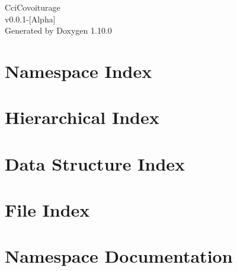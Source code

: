 \documentclass[twoside]{book}
\newcommand{\+}{\discretionary{\mbox{\scriptsize$\hookleftarrow$}}{}{}}
\newcommand{\clearemptydoublepage}{%
    \newpage{\pagestyle{empty}\cleardoublepage}%
  }
\begin{document}
  \raggedbottom
    \hypersetup{pageanchor=false,
                bookmarksnumbered=true,
                pdfencoding=unicode
               }
  \begin{titlepage}
  \vspace*{7cm}
  \begin{center}%
  {\Large Cci\+Covoiturage}\\
  [1ex]\large v0.\+0.\+1-\/\mbox{[}\+Alpha\mbox{]} \\
  \vspace*{1cm}
  {\large Generated by Doxygen 1.10.0}\\
  \end{center}
  \end{titlepage}
  \clearemptydoublepage
  \tableofcontents
  \clearemptydoublepage
  \hypersetup{pageanchor=true}



\chapter{Namespace Index}

\chapter{Hierarchical Index}

\chapter{Data Structure Index}

\chapter{File Index}

\chapter{Namespace Documentation}






\end{document}
